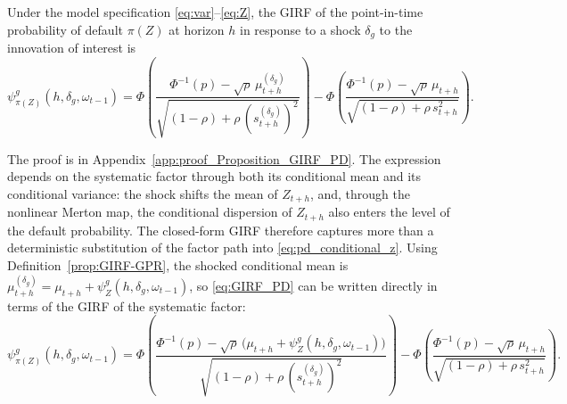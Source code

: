 \begin{prop}\label{prop:GIRF-PD}
    Under the model specification \eqref{eq:var}--\eqref{eq:Z}, the GIRF of
    the point-in-time probability of default $\pi(Z)$ at horizon $h$ in
    response to a shock $\delta_g$ to the innovation of interest is
    \begin{equation}
        \psi^g_{\pi(Z)}(h,\delta_g,\omega_{t-1})
        =
        \Phi\!\left(
            \frac{\Phi^{-1}(p) - \sqrt{\rho}\,\mu_{t+h}^{(\delta_g)}}
            {\sqrt{(1-\rho)+\rho\,(s_{t+h}^{(\delta_g)})^2}}
        \right)
        -
        \Phi\!\left(
            \frac{\Phi^{-1}(p) - \sqrt{\rho}\,\mu_{t+h}}
            {\sqrt{(1-\rho)+\rho\,s_{t+h}^2}}
        \right).
        \label{eq:GIRF_PD}
    \end{equation}
\end{prop}
The proof is in Appendix~\ref{app:proof_Proposition_GIRF_PD}. The expression
depends on the systematic factor through both its conditional mean and its
conditional variance: the shock shifts the mean of $Z_{t+h}$, and, through the
nonlinear Merton map, the conditional dispersion of $Z_{t+h}$ also enters the
level of the default probability. The closed-form GIRF therefore captures more
than a deterministic substitution of the factor path into
\eqref{eq:pd_conditional_z}. Using Definition~\ref{prop:GIRF-GPR}, the shocked
conditional mean is $\mu_{t+h}^{(\delta_g)} = \mu_{t+h} +
\psi^g_{Z}(h,\delta_g,\omega_{t-1})$, so \eqref{eq:GIRF_PD} can be written
directly in terms of the GIRF of the systematic factor:
\begin{equation*}
    \psi^g_{\pi(Z)}(h,\delta_g,\omega_{t-1})
    =
    \Phi\!\left( \frac{\Phi^{-1}(p) - \sqrt{\rho}\,\big(\mu_{t+h} + \psi^g_{Z}(h,\delta_g,\omega_{t-1})\big)}{\sqrt{(1-\rho)+\rho\,(s^{(\delta_g)}_{t+h})^2}} \right)
    -
    \Phi\!\left( \frac{\Phi^{-1}(p) - \sqrt{\rho}\,\mu_{t+h}}{\sqrt{(1-\rho)+\rho\,s_{t+h}^2}} \right).
\end{equation*}
